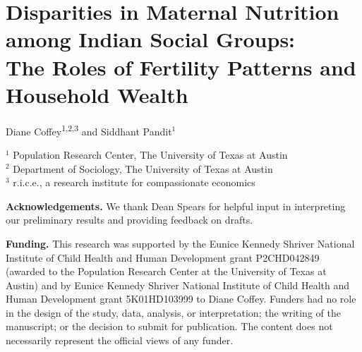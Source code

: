\documentclass[12pt]{article}
\begin{document}
\thispagestyle{empty}
\singlespacing
\RaggedRight




\section*{Disparities in Maternal Nutrition among Indian Social Groups: \\The Roles of Fertility Patterns and Household Wealth} 


\vspace{1.2em}

\begin{center}
Diane Coffey\textsuperscript{1,2,3}
and Siddhant Pandit$^{1}$
\end{center}



\vspace{1.2em}

\noindent
$^{1}$ Population Research Center, The University of Texas at Austin\\
$^{2}$ Department of Sociology, The University of Texas at Austin\\
$^{3}$ r.i.c.e., a research institute for compassionate economics

\vspace{1.5em}

\noindent\textbf{Acknowledgements.}  
We thank Dean Spears for helpful input in interpreting our preliminary results and providing feedback on drafts. 

\vspace{1em}

\noindent\textbf{Funding.}  
This research was supported by the Eunice Kennedy Shriver National Institute of Child Health and Human Development grant P2CHD042849 (awarded to the Population Research Center at the University of Texas at Austin) and by Eunice Kennedy Shriver National Institute of Child Health and Human Development grant 5K01HD103999 to Diane Coffey. Funders had no role in the design of the study, data, analysis, or interpretation; the writing of the manuscript; or the decision to submit for publication. The content does not necessarily represent the official views of any funder. 
\end{document}
